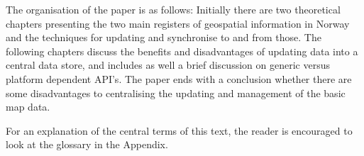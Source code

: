 The organisation of the paper is as follows: Initially there are two theoretical chapters presenting the two main registers of geospatial information in Norway and the techniques for updating and synchronise to and from those. 
The following chapters discuss the benefits and disadvantages of updating data into a central data store, and includes as well a brief discussion on generic versus platform dependent API's. The paper ends with a conclusion whether there are some disadvantages to centralising the updating and management of the basic map data.

For an explanation of the central terms of this text, the reader is encouraged to look at the glossary in the Appendix.


